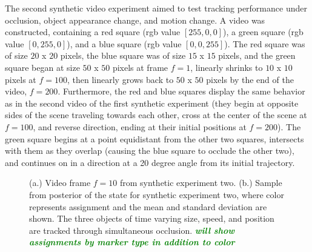 \documentclass[smallcondensed, final]{svjour3}
\newcommand{\willie}[1]{\textcolor{green}{\textsf{\emph{\textbf{\textcolor{green}{#1}}}}}}
\begin{document}
The second synthetic video experiment aimed to test tracking performance under occlusion, object appearance change, and motion change. A video was constructed, containing a red square (rgb value $[255,0,0]$), a green square (rgb value $[0,255,0]$), and a blue square (rgb value $[0,0,255]$). The red square was of size $20$ x $20$ pixels, the blue square was of size $15$ x $15$ pixels, and the green square began at size $50$ x $50$ pixels at frame $f=1$, linearly shrinks to $10$ x $10$ pixels at $f=100$, then linearly grows back to $50$ x $50$ pixels by the end of the video, $f=200$. Furthermore, the red and blue squares display the same behavior as in the second video of the first synthetic experiment (they begin at opposite sides of the scene traveling towards each other, cross at the center of the scene at $f=100$, and reverse direction, ending at their initial positions at $f=200$). The green square begins at a point equidistant from the other two squares, intersects with them as they overlap (causing the blue square to occlude the other two), and continues on in a direction at a 20 degree angle from its initial trajectory.

\begin{figure}
  \centering               
  \caption{(a.) Video frame $f=10$ from synthetic experiment two. (b.) Sample from posterior of the state for synthetic experiment two, where color represents assignment and the mean and standard deviation are shown. The three objects of time varying size, speed, and position are tracked through simultaneous occlusion.  \willie{will show assignments by marker type in addition to color}}
  \label{fig:synth_two_plot}
\end{figure}
\end{document}
